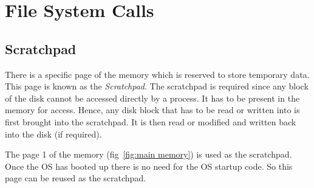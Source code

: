 \chapter{File System Calls}
\label{chp:file_system_calls}

\section{Scratchpad}
There is a specific page of the memory which is reserved to store temporary data. This page is known as the \textit{Scratchpad}. The scratchpad is required since any block of the disk cannot be accessed directly  by a process. It has to be present in the memory for access. Hence, any disk block that has to be read or written into is first brought into the scratchpad. It is then read or modified and written back into the disk (if required).

The page 1 of the memory (fig~\ref{fig:main memory}) is used as the scratchpad. Once the OS has booted up there is no need for the OS startup code. So this page can be reused as the scratchpad.

